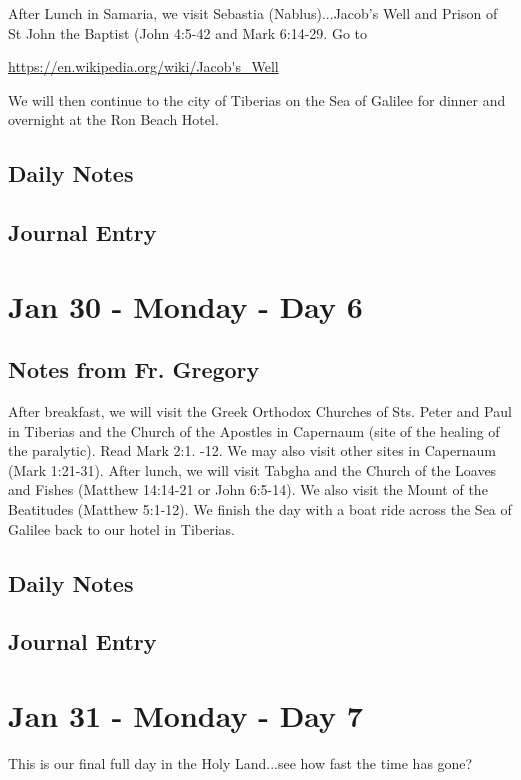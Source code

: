 \documentclass[letterpaper]{report}
\begin{document}
After Lunch in Samaria, we visit Sebastia (Nablus)...Jacob's Well and Prison of St John the Baptist (John 4:5-42 and Mark 6:14-29. Go to

\url{https://en.wikipedia.org/wiki/Jacob's_Well}

We will then continue to the city of Tiberias on the Sea of Galilee for dinner and overnight at the Ron Beach Hotel.


\subsection{Daily Notes}

\subsection{Journal Entry}

\clearpage
\section{Jan 30 - Monday - Day 6}

\subsection{Notes from Fr. Gregory}
After breakfast, we will visit the Greek Orthodox Churches of Sts. Peter and Paul in Tiberias and the Church of the Apostles in Capernaum (site of the healing of the paralytic). Read Mark 2:1. -12. We may also visit other sites in Capernaum (Mark 1:21-31). After lunch, we will visit Tabgha and the Church of the Loaves and Fishes (Matthew 14:14-21 or John 6:5-14). We also visit the Mount of the Beatitudes (Matthew 5:1-12). We finish the day with a boat ride across the Sea of Galilee back to our hotel in Tiberias.


\subsection{Daily Notes}

\clearpage
\subsection{Journal Entry}

\clearpage
\section{Jan 31 - Monday - Day 7}
This is our final full day in the Holy Land...see how fast the time has gone?
\end{document}
